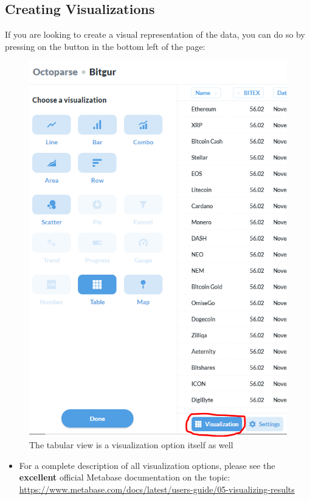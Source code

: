 \documentclass[
]{book}
\providecommand{\tightlist}{%
  \setlength{\itemsep}{0pt}\setlength{\parskip}{0pt}}
\begin{document}
\hypertarget{creating-visualizations}{%
\subsection{Creating Visualizations}\label{creating-visualizations}}

If you are looking to create a visual representation of the data, you can do so by pressing on the button in the bottom left of the page:

\begin{figure}
\centering
\includegraphics{images/VisualizationSelection.png}
\caption{The tabular view is a visualization option itself as well}
\end{figure}

\begin{itemize}
\tightlist
\item
  For a complete description of all visualization options, please see the \textbf{excellent} official Metabase documentation on the topic: \url{https://www.metabase.com/docs/latest/users-guide/05-visualizing-results}
\end{itemize}
\end{document}
